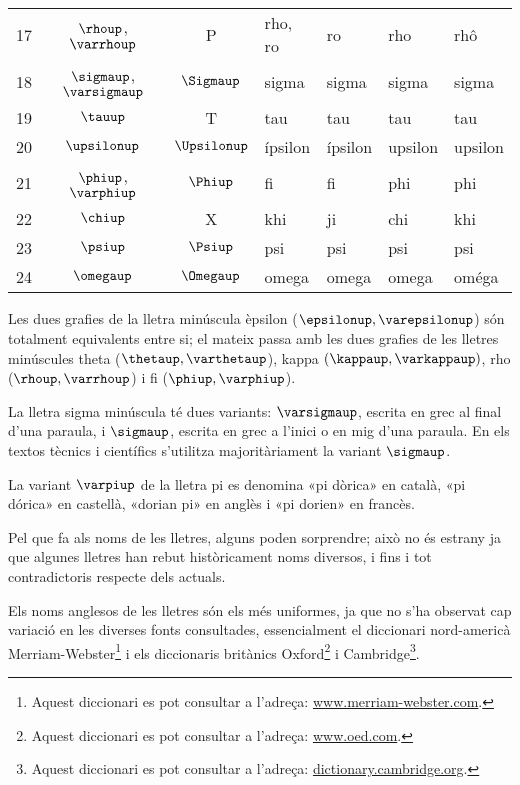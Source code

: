 \begin{center}
\begin{tabular}{cccllll}
   17 & $\rhoup$, $\varrhoup$ & P & rho, ro & ro &  rho & rhô\\
   18 & $\sigmaup$, $\varsigmaup$ & $\Sigmaup$ & sigma & sigma &  sigma &sigma\\
   19 & $\tauup$ & T & tau & tau & tau &tau\\
   20 & $\upsilonup$ & $\Upsilonup$ & ípsilon & ípsilon &  upsilon &upsilon\\
   21 & $\phiup$, $\varphiup$ & $\Phiup$ & fi & fi &  phi & phi\\
   22 & $\chiup$ & X & khi & ji &  chi & khi\\
   23 & $\psiup$ & $\Psiup$ & psi & psi &  psi & psi\\
   24 & $\omegaup$ & $\Omegaup$ & omega & omega &  omega & oméga\\
   \bottomrule[1pt]
   \end{tabular}
\end{center}
\pagebreak


Les dues grafies de la lletra minúscula èpsilon  ($\epsilonup,
\varepsilonup$) són totalment equivalents entre si; el mateix passa
amb les dues grafies de les lletres minúscules theta ($\thetaup,
\varthetaup$), kappa $(\kappaup, \varkappaup)$, rho ($\rhoup,\varrhoup$) i fi ($\phiup, \varphiup$).

La lletra sigma minúscula té dues variants: $\varsigmaup$, escrita en
grec al final d'una paraula, i $\sigmaup$, escrita en grec a l'inici o
en mig d'una paraula. En els textos tècnics i científics s'utilitza
majoritàriament la variant $\sigmaup$.

La variant $\varpiup$ de la lletra pi es denomina «pi dòrica» en
català, «pi dórica» en castellà, «dorian pi» en anglès i «pi dorien» en francès.

Pel que fa als noms de les lletres, alguns poden sorprendre; això no
és estrany ja que algunes lletres han rebut històricament noms
diversos, i fins i tot contradictoris respecte dels actuals.

Els noms anglesos de les lletres són els més uniformes, ja que no
s'ha observat cap variació en les diverses fonts consultades, essencialment el diccionari nord-americà Merriam-Webster\footnote{Aquest diccionari es pot consultar a l'adreça: \href{https://www.merriam-webster.com/}{www.merriam-webster.com}.} i els diccionaris britànics Oxford\footnote{Aquest diccionari es pot consultar a l'adreça: \href{http://www.oed.com/}{www.oed.com}.} i Cambridge\footnote{Aquest diccionari es pot consultar a l'adreça: \href{http://dictionary.cambridge.org/}{dictionary.cambridge.org}.}.


